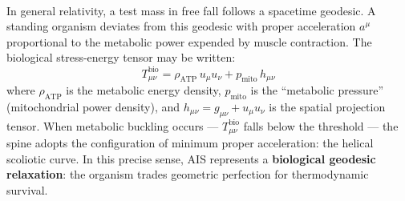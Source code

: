 \documentclass[12pt]{article}
\begin{document}
\vspace{0.5em}
\noindent In general relativity, a test mass in free fall follows a spacetime geodesic\textsuperscript{\cite{misner1973}}. A standing organism deviates from this geodesic with proper acceleration $a^\mu$ proportional to the metabolic power expended by muscle contraction. The biological stress-energy tensor may be written:
\[
T^{\text{bio}}_{\mu\nu} = \rho_{\text{ATP}}\,u_\mu u_\nu + p_{\text{mito}}\,h_{\mu\nu}
\]
where $\rho_{\text{ATP}}$ is the metabolic energy density, $p_{\text{mito}}$ is the ``metabolic pressure'' (mitochondrial power density), and $h_{\mu\nu} = g_{\mu\nu} + u_\mu u_\nu$ is the spatial projection tensor. When metabolic buckling occurs --- $T^{\text{bio}}_{\mu\nu}$ falls below the threshold --- the spine adopts the configuration of minimum proper acceleration: the helical scoliotic curve. In this precise sense, AIS represents a \textbf{biological geodesic relaxation}: the organism trades geometric perfection for thermodynamic survival.
\end{document}

